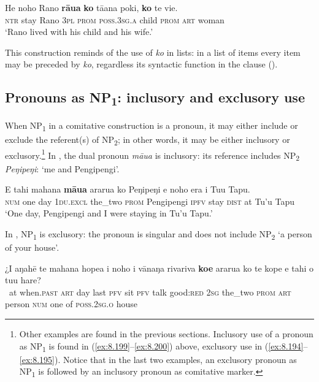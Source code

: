 \ea\label{ex:8.208}
\gll He noho Rano \textbf{rāua} \textbf{ko} tā{\ꞌ}ana poki, \textbf{ko} te vi{\ꞌ}e.\\
\textsc{ntr} stay Rano \textsc{3pl} \textsc{prom} \textsc{poss.3sg.a} child \textsc{prom} \textsc{art} woman\\

\glt
‘Rano lived with his child and his wife.’ \textstyleExampleref{[Mtx-7-18.001]}
\z

This construction reminds of the use of \textit{ko} in lists: in a list of items every item may be preceded by \textit{ko}, regardless its syntactic function in the clause ().
\subsection{Pronouns as NP\textsubscript{1}: inclusory and exclusory use}\label{sec:8.10.6}
When NP\textsubscript{1} in a comitative construction is a pronoun, it may either include or exclude the referent(s) of NP\textsubscript{2}; in other words, it may be either inclusory or exclusory.\footnote{\label{fn:448}Other examples are found in the previous sections. Inclusory use of a pronoun as NP\textsubscript{1} is found in (\ref{ex:8.199}–\ref{ex:8.200}) above, exclusory use in (\ref{ex:8.194}–\ref{ex:8.195}). Notice that in the last two examples, an exclusory pronoun as NP\textsubscript{1} is followed by an inclusory pronoun as comitative marker.} In , the dual pronoun \textit{māua} is inclusory: its reference includes NP\textsubscript{2} \textit{Peŋipeŋi}: ‘me and Pengipengi’.

\ea\label{ex:8.209}
\gll E tahi mahana \textbf{māua} ararua ko Peŋipeŋi e noho era {\ꞌ}i Tu{\ꞌ}u Tapu.\\
\textsc{num} one day \textsc{1du.excl} the\_two \textsc{prom} Pengipengi \textsc{ipfv} stay \textsc{dist} at Tu’u Tapu\\

\glt
‘One day, Pengipengi and I were staying in Tu’u Tapu.’ \textstyleExampleref{[R133.001]} 
\z

In , NP\textsubscript{1} is exclusory: the pronoun is singular and does not include NP\textsubscript{2} ‘a person of your house’.

\ea\label{ex:8.210}
\gll ¿{\ꞌ}I {\ꞌ}aŋahē te mahana hope{\ꞌ}a i noho i vānaŋa rivariva  \textbf{koe} ararua ko te kope e tahi o tu{\ꞌ}u hare?\\
~at when.\textsc{past} \textsc{art} day last \textsc{pfv} sit \textsc{pfv} talk good:\textsc{red}  \textsc{2sg} the\_two \textsc{prom} \textsc{art} person \textsc{num} one of \textsc{poss.2sg.o} house\\

